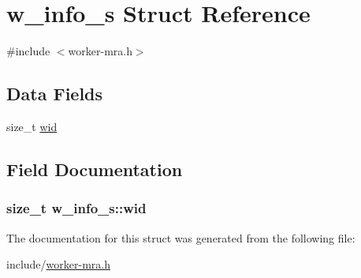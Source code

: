 \hypertarget{structw__info__s}{\section{w\-\_\-info\-\_\-s \-Struct \-Reference}
\label{structw__info__s}
}


{\ttfamily \#include $<$worker-\/mra.\-h$>$}

\subsection*{\-Data \-Fields}
\begin{DoxyCompactItemize}
\item 
size\-\_\-t \hyperlink{structw__info__s_ae293128296d6f73011e64ebbd840cb0c}{wid}
\end{DoxyCompactItemize}


\subsection{\-Field \-Documentation}
\hypertarget{structw__info__s_ae293128296d6f73011e64ebbd840cb0c}{
\subsubsection[{wid}]{\setlength{\rightskip}{0pt plus 5cm}size\-\_\-t {\bf w\-\_\-info\-\_\-s\-::wid}}}\label{structw__info__s_ae293128296d6f73011e64ebbd840cb0c}


\-The documentation for this struct was generated from the following file\-:\begin{DoxyCompactItemize}
\item 
include/\hyperlink{worker-mra_8h}{worker-\/mra.\-h}\end{DoxyCompactItemize}
